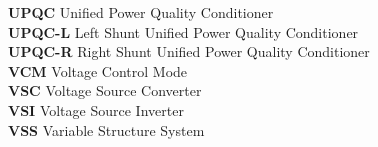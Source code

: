 \begin{tabbing}
\textbf{UPQC}  \> Unified Power Quality Conditioner						\\
\textbf{UPQC-L}  \> Left Shunt Unified Power Quality Conditioner						\\
\textbf{UPQC-R}  \> Right Shunt Unified Power Quality Conditioner						\\

\textbf{VCM}  \> Voltage Control Mode						\\
\textbf{VSC}  \> Voltage Source Converter						\\
\textbf{VSI}  \> 	Voltage Source Inverter					\\
\textbf{VSS}  \> Variable Structure System						\\
%
\end{tabbing}